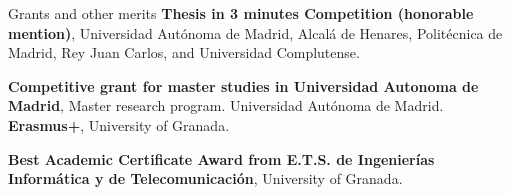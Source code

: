 \begin{rubric}{Grants and other merits}
\entry*[June 2022] \textbf{Thesis in 3 minutes Competition (honorable mention)}, Universidad Autónoma de Madrid, Alcalá de Henares, Politécnica de Madrid, Rey Juan Carlos, and Universidad Complutense.


\entry*[2018-2019] \textbf{Competitive grant for master studies in Universidad Autonoma de Madrid}, Master research program. Universidad Autónoma de Madrid.
%
\entry*[2016-2017] \textbf{Erasmus+}, University of Granada.

\entry*[2016] \textbf{Best Academic Certificate Award from E.T.S. de Ingenierías Informática y de Telecomunicación}, University of Granada.

\end{rubric}